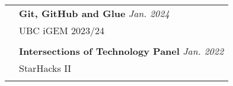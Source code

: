 \documentclass[letterpaper, 11pt]{article}
\begin{document}
\begin{longtable}{p{1.3in}p{4.8in}}
	{\color{Blue}{Talks and tutorials}}
	 & \textbf{Git, GitHub and Glue} \hfill \textit{Jan. 2024}                                                                                                                                                                                                                                                                                                                                   \\
	 & UBC iGEM 2023/24                                                                                                                                                                                                                                                                                                                                                                          \\
	 &                                                                                                                                                                                                                                                                                                                                                                                           \\

	 & \textbf{Intersections of Technology Panel} \hfill \textit{Jan. 2022}                                                                                                                                                                                                                                                                                                                      \\
	 & StarHacks II                                                                                                                                                                                                                                                                                                                                                                              \\
	 &                                                                                                                                                                                                                                                                                                                                                                                           \\


\end{longtable}
\end{document}
